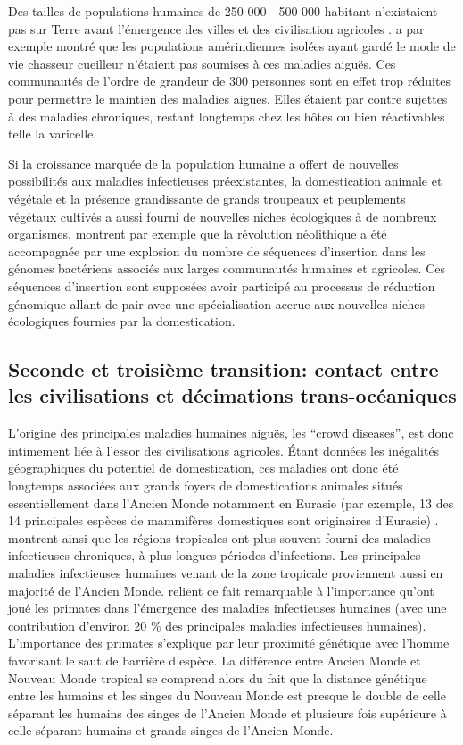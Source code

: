 Des tailles de populations humaines de 250 000 - 500 000 habitant
n'existaient pas sur Terre avant l'émergence des villes et des
civilisation agricoles \citep{Diamond1999}. \citet{Black1975} a par
exemple montré que les populations amérindiennes isolées ayant gardé
le mode de vie chasseur cueilleur n'étaient pas soumises à ces
maladies aiguës. Ces communautés de l'ordre de grandeur de 300
personnes sont en effet trop réduites pour permettre le maintien des
maladies aigues. Elles étaient par contre sujettes à des maladies
chroniques, restant longtemps chez les hôtes ou bien réactivables
telle la varicelle.

Si la croissance marquée de la population humaine a offert de
nouvelles possibilités aux maladies infectieuses préexistantes, la
domestication animale et végétale et la présence grandissante de
grands troupeaux et peuplements végétaux cultivés a aussi fourni de
nouvelles niches écologiques à de nombreux organismes.
\citet{Mira2006} montrent par exemple que la révolution néolithique a
été accompagnée par une explosion du nombre de séquences d'insertion
dans les génomes bactériens associés aux larges communautés humaines
et agricoles. Ces séquences d'insertion sont supposées avoir participé
au processus de réduction génomique allant de pair avec une
spécialisation accrue aux nouvelles niches écologiques fournies par la
domestication.

\subsection{Seconde et troisième transition: contact entre les
  civilisations et décimations trans-océaniques}

L'origine des principales maladies humaines aiguës, les ``crowd
diseases'', est donc intimement liée à l'essor des civilisations
agricoles. Étant données les inégalités géographiques du potentiel de
domestication, ces maladies ont donc été longtemps associées aux
grands foyers de domestications animales situés essentiellement dans
l'Ancien Monde notamment en Eurasie (par exemple, 13 des 14
principales espèces de mammifères domestiques sont originaires
d'Eurasie) \citep{Diamond2002}. \citet{Wolfe2007a} montrent ainsi que
les régions tropicales ont plus souvent fourni des maladies
infectieuses chroniques, à plus longues périodes d'infections. Les
principales maladies infectieuses humaines venant de la zone tropicale
proviennent aussi en majorité de l'Ancien Monde. \citet{Wolfe2007a}
relient ce fait remarquable à l'importance qu'ont joué les primates
dans l'émergence des maladies infectieuses humaines (avec une
contribution d'environ 20 \% des principales maladies infectieuses
humaines). L'importance des primates s'explique par leur proximité
génétique avec l'homme favorisant le saut de barrière d'espèce. La
différence entre Ancien Monde et Nouveau Monde tropical se comprend
alors du fait que la distance génétique entre les humains et les
singes du Nouveau Monde est presque le double de celle séparant les
humains des singes de l'Ancien Monde et plusieurs fois supérieure à
celle séparant humains et grands singes de l'Ancien Monde.

